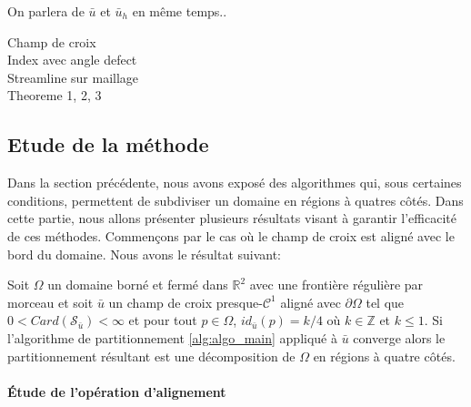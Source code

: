 On parlera de $\bar{u}$ et $\bar{u}_h$ en même temps..

Champ de croix\\
Index avec angle defect\\
Streamline sur maillage\\
Theoreme 1, 2, 3\\
\subsection{Etude de la méthode}

Dans la section précédente, nous avons exposé des algorithmes qui, sous certaines conditions, permettent de subdiviser un domaine en régions à quatres côtés. Dans cette partie, nous allons présenter plusieurs résultats visant à garantir l'efficacité de ces méthodes. Commençons par le cas où le champ de croix est aligné avec le bord du domaine. Nous avons le résultat suivant:
\begin{theorem}

Soit $\Omega$ un domaine borné et fermé dans $\mathbb{R}^2$ avec une frontière régulière par morceau et soit $\bar{u}$ un champ de croix presque-$\mathcal{C}^1$ aligné avec $\partial\Omega$ tel que $0<Card(\mathcal{S}_{\bar{u}})<\infty$ et pour tout $p\in\Omega$, $id_{\bar{u}}(p)=k/4$ où $k\in\mathbb{Z}$ et $k\leq 1$. Si l'algorithme de partitionnement \ref{alg:algo_main} appliqué à $\bar{u}$ converge alors le partitionnement résultant est une décomposition de $\Omega$ en régions à quatre côtés.
\end{theorem}


\paragraph{\'Etude de l'opération d'alignement}

